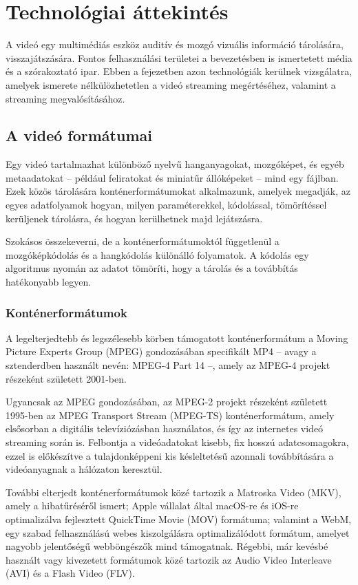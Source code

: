 \chapter{Technológiai áttekintés}

A videó egy multimédiás eszköz auditív és mozgó vizuális információ tárolására, visszajátszására. Fontos felhasználási területei a bevezetésben is ismertetett média és a szórakoztató ipar. Ebben a fejezetben azon technológiák kerülnek vizsgálatra, amelyek ismerete nélkülözhetetlen a videó streaming megértéséhez, valamint a streaming megvalósításához.

\section{A videó formátumai}

Egy videó tartalmazhat különböző nyelvű hanganyagokat, mozgóképet, és egyéb metaadatokat -- például feliratokat és miniatűr állóképeket -- mind egy fájlban. Ezek közös tárolására konténerformátumokat alkalmazunk, amelyek megadják, az egyes adatfolyamok hogyan, milyen paraméterekkel, kódolással, tömörítéssel kerüljenek tárolásra, és hogyan kerülhetnek majd lejátszásra.

Szokásos összekeverni, de a konténerformátumoktól függetlenül a mozgóképkódolás és a hangkódolás különálló folyamatok. A kódolás egy algoritmus nyomán az adatot tömöríti, hogy a tárolás és a továbbítás hatékonyabb legyen.

\subsection{Konténerformátumok}

A legelterjedtebb és legszélesebb körben támogatott konténerformátum a Moving Picture Experts Group (MPEG) gondozásában specifikált MP4 -- avagy a sztenderdben használt nevén: MPEG-4 Part 14 --, amely az MPEG-4 projekt részeként született 2001-ben.

Ugyancsak az MPEG gondozásában, az MPEG-2 projekt részeként született 1995-ben az MPEG Transport Stream (MPEG-TS) konténerformátum, amely elsősorban a digitális televíziózásban használatos, és így az internetes videó streaming során is. Felbontja a videóadatokat kisebb, fix hosszú adatcsomagokra, ezzel is előkészítve a tulajdonképpeni kis késleltetésű azonnali továbbítására a videóanyagnak a hálózaton keresztül.

További elterjedt konténerformátumok közé tartozik a Matroska Video (MKV), amely a hibatűréséről ismert; Apple vállalat által macOS-re és iOS-re optimalizálva fejlesztett QuickTime Movie (MOV) formátuma; valamint a WebM, egy szabad felhasználású webes kiszolgálásra optimalizálódott formátum, amelyet nagyobb jelentőségű webböngészők mind támogatnak. Régebbi, már kevésbé használt vagy kivezetett formátumok közé tartozik az Audio Video Interleave (AVI) és a Flash Video (FLV).

